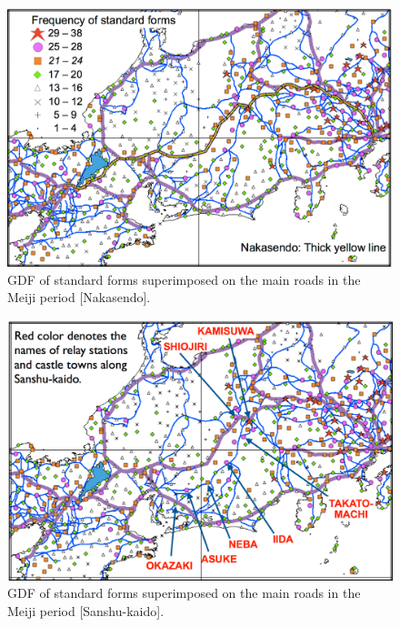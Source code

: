 \documentclass[output=paper]{LSP/langsci}
\begin{document}
\begin{figure}[p]
\includegraphics[height=0.4\textheight]{illustrations/kuma_fig09}
\caption{GDF of standard forms superimposed on the main roads in the Meiji period [Nakasendo].}          
\label{fig:kuma:9}
\end{figure}
\newpage	


\begin{figure}[p]
\includegraphics[height=0.4\textheight]{illustrations/kuma_fig10}
\caption{GDF of standard forms superimposed on the main roads in the Meiji period [Sanshu-kaido].}          
\label{fig:kuma:10}
\end{figure}
\clearpage
\end{document}
